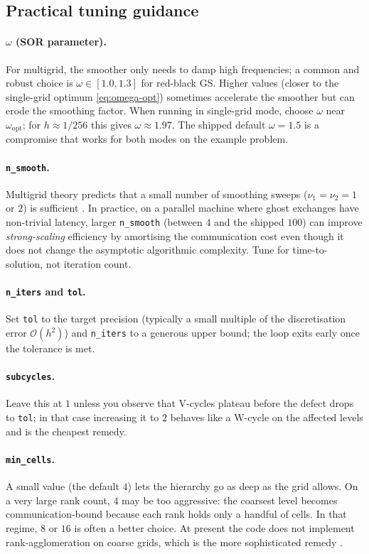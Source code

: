 \documentclass[11pt]{article}
\theoremstyle{definition}
\newcommand{\bigO}{\mathcal{O}}
\begin{document}
\subsection{Practical tuning guidance}\label{sec:tuning}
\paragraph{$\omega$ (SOR parameter).}
For multigrid, the smoother only needs to damp high frequencies; a
common and robust choice is $\omega \in [1.0, 1.3]$ for red-black GS.
Higher values (closer to the single-grid optimum
\eqref{eq:omega-opt}) sometimes accelerate the smoother but can erode
the smoothing factor.  When running in single-grid mode, choose
$\omega$ near $\omega_{\mathrm{opt}}$; for $h \approx 1/256$ this gives
$\omega \approx 1.97$.  The shipped default $\omega=1.5$ is a
compromise that works for both modes on the example problem.

\paragraph{\texttt{n\_smooth}.}
Multigrid theory predicts that a small number of smoothing sweeps
($\nu_1 = \nu_2 = 1$ or $2$) is sufficient
\cite[\S4]{trottenberg2001multigrid}.  In practice, on a parallel
machine where ghost exchanges have non-trivial latency, larger
\texttt{n\_smooth} (between $4$ and the shipped $100$) can improve
\emph{strong-scaling} efficiency by amortising the communication cost
even though it does not change the asymptotic algorithmic complexity.
Tune for time-to-solution, not iteration count.

\paragraph{\texttt{n\_iters} and \texttt{tol}.}
Set \texttt{tol} to the target precision (typically a small multiple of
the discretisation error $\bigO(h^2)$) and \texttt{n\_iters} to a
generous upper bound; the loop exits early once the tolerance is met.

\paragraph{\texttt{subcycles}.}
Leave this at $1$ unless you observe that V-cycles plateau before the
defect drops to \texttt{tol}; in that case increasing it to $2$
behaves like a W-cycle on the affected levels and is the cheapest
remedy.

\paragraph{\texttt{min\_cells}.}
A small value (the default $4$) lets the hierarchy go as deep as
the grid allows.  On a very large rank count, $4$ may be too
aggressive: the coarsest level becomes communication-bound because each
rank holds only a handful of cells.  In that regime, $8$ or $16$ is
often a better choice.  At present the code does not implement
rank-agglomeration on coarse grids, which is the more sophisticated
remedy \cite[\S6.3]{trottenberg2001multigrid}.
\end{document}
